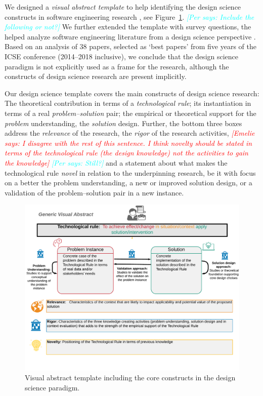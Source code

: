 \documentclass[graybox]{svmult}
\newcommand{\emelie}[1]{\textcolor{red}{{\it [Emelie says: #1]}}}
\newcommand{\per}[1]{\textcolor{cyan}{{\it [Per says: #1]}}}
\newcommand{\emelie}[1]{}
\newcommand{\per}[1]{}
\begin{document}
We designed a \emph{visual abstract template} to help identifying the design science constructs in software engineering research \cite{StoreyESEM17}, see Figure~\ref{fig:VA-template}. 
\per{Include the following or not?} We further extended the template with survey questions, the helped analyze software engineering literature from a design science perspective \cite{Engstrom19arxiv}. Based on an analysis of 38 papers, selected as `best papers' from five years of the ICSE conference (2014--2018 inclusive), we conclude that the design science paradigm is not explicitly used as a frame for the research, although the constructs of design science research are present implicitly. 

Our design science template covers the main constructs of design science research: The theoretical contribution in terms of a \emph{technological rule}; its instantiation in terms of a real \emph{problem--solution} pair;  the empirical or theoretical support for the \emph{problem} understanding, the \emph{solution} design. Further, the bottom three boxes address the \emph{relevance} of the research, the \emph{rigor} of the research activities, \emelie{I disagree with the rest of this sentence. I think novelty should be stated in terms of the technological rule (the design knowledge) not the activities to gain the knowledge} \per{Still?} and a statement about what makes the technological rule \emph{novel} in relation to the underpinning research, be it with focus on a  better the problem understanding, a new or improved solution design, or a validation of the problem--solution pair in a new instance. 

\begin{figure}[t]
  \includegraphics[width=1.0\textwidth]{Figures/GenericVA.png}
\caption{Visual abstract template including the core constructs in the design science paradigm.}
\label{fig:VA-template}       %
\end{figure}
\end{document}
